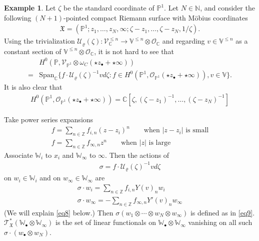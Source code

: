 \documentclass[11pt,b5paper,notitlepage]{article}
\theoremstyle{definition}
\newtheorem{eg}[df]{Example}
\theoremstyle{plain}
\newcommand{\fk}{\mathfrak}
\newcommand{\mc}{\mathcal}
\newcommand{\Span}{\mathrm{Span}}
\newcommand{\scr}{\mathscr}
\newcommand{\blt}{\bullet}
\newcommand{\Vbb}{\mathbb V}
\newcommand{\Wbb}{\mathbb W}
\newcommand{\Cbb}{\mathbb C}
\newcommand{\Nbb}{\mathbb N}
\newcommand{\Zbb}{\mathbb Z}
\newcommand{\Pbb}{\mathbb P}
\numberwithin{equation}{section}
\begin{document}
\begin{eg}\label{lb4}
Let $\zeta$ be the standard coordinate of $\Pbb^1$. Let $N\in\Nbb$, and consider the following $(N+1)$-pointed compact Riemann surface with M\"obius coordinates
\begin{align}
\fk X=(\Pbb^1;z_1,\dots,z_N,\infty;\zeta-z_1,\dots,\zeta-z_N,1/\zeta).  \label{eq18}
\end{align}
Using the trivialization $\mc U_\varrho(\zeta):\scr V_{\Cbb}^{\leq n}\rightarrow \Vbb^{\leq n}\otimes\scr O_\Cbb$ and regarding $v\in\Vbb^{\leq n}$ as a constant section of $\Vbb^{\leq n}\otimes\scr O_\Cbb$, it is not hard to see that
\begin{align*}
&H^0(\Pbb,\scr V_{\Pbb^1}\otimes\omega_C(\star z_\blt+\star\infty))\\
=&\Span_\Cbb\{f\cdot\mc U_\varrho(\zeta)^{-1}vd\zeta:f\in H^0(\Pbb^1,\scr O_{\Pbb^1}(\star z_\blt+\star\infty)),v\in\Vbb \}.
\end{align*}
It is also clear that
\begin{align}
H^0(\Pbb^1,\scr O_{\Pbb^1}(\star z_\blt+\star\infty))=\Cbb[\zeta,(\zeta-z_1)^{-1},\dots,(\zeta-z_N)^{-1}]
\end{align}

Take power series expansions
\begin{subequations}\label{eq12}
\begin{gather}
f=\sum_{n\in\Zbb} f_{i,n} (z-z_i)^n\qquad\text{when $|z-z_i|$ is small}  \label{eq96}\\
f=\sum_{n\in\Zbb}f_{\infty,n}z^n\qquad\text{when $|z|$ is large} \label{eq97}
\end{gather}
\end{subequations}
Associate $\Wbb_i$ to $x_i$ and $\Wbb_\infty$ to $\infty$. Then the actions of
\begin{align*}
\sigma=f\cdot\mc U_\varrho(\zeta)^{-1}vd\zeta
\end{align*}
on $w_i\in\Wbb_i$ and on $w_\infty\in\Wbb_\infty$ are
\begin{subequations}
\begin{gather}
\sigma\cdot w_i=\sum_{n\in \Zbb}f_{i,n}Y(v)_nw_i \label{eq7} \\
\sigma\cdot w_\infty=-\sum_{n\in\Zbb} f_{\infty,n}Y'(v)_n w_\infty \label{eq8}
\end{gather}
\end{subequations}
(We will explain \eqref{eq8} below.) Then $\sigma(w_1\otimes\cdots\otimes w_N\otimes w_\infty)$ is defined as in \eqref{eq9}. $\scr T_{\fk X}^*(\Wbb_\blt\otimes\Wbb_\infty)$ is the set of linear functionals on $\Wbb_\blt\otimes\Wbb_\infty$ vanishing on all such $\sigma\cdot(w_\blt\otimes w_N)$. \hfill\qedsymbol
\end{eg}
\end{document}
